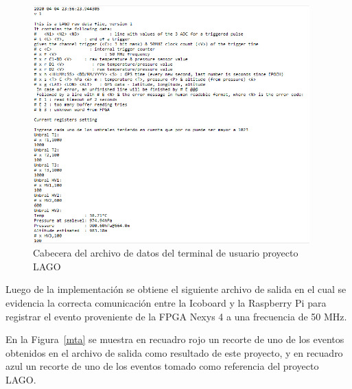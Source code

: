 
\begin{figure}[H]
\includegraphics[width=0.95\textwidth]{Figs/terminal.PNG} 
\centering
\caption{Cabecera del archivo de datos del terminal de usuario proyecto LAGO}
\label{adecuacion}
\end{figure}

Luego de la implementación se obtiene el siguiente archivo de salida en el cual se evidencia la correcta comunicación entre la Icoboard y la Raspberry Pi para registrar el evento proveniente de la FPGA Nexys 4 a una frecuencia de 50 MHz. 

En la Figura~\ref{mta} se muestra en recuadro rojo un recorte de uno de los eventos obtenidos en el archivo de salida como resultado de este proyecto, y en recuadro azul un recorte de uno de los eventos tomado como referencia del proyecto LAGO. 


